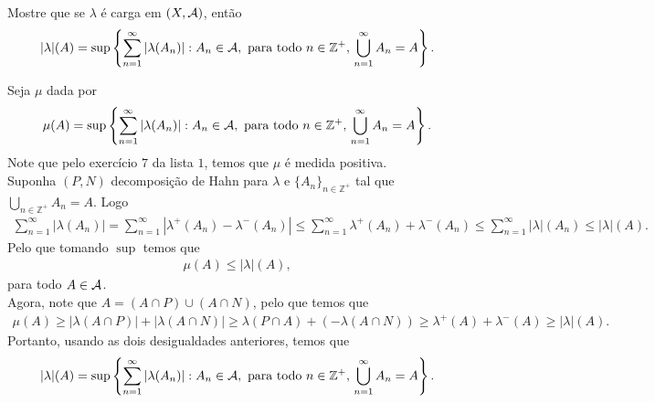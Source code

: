 \begin{homeworkProblem}[1]
  Mostre que se $\lambda$ é carga em $(X,\mathcal{A})$, então
  \begin{align*}
    |\lambda|(A)=\sup\left\{ \sum_{n=1}^{\infty}|\lambda(A_n)|:A_n\in\mathcal{A},\text{ para todo }n\in\mathbb{Z}^{+},\,\bigcup_{n=1}^{\infty}A_n=A \right\}.
  \end{align*}
  \begin{solution}
    Seja $\mu$ dada por
    \begin{align*}
      \mu(A)=\sup\left\{ \sum_{n=1}^{\infty}|\lambda(A_n)|:A_n\in\mathcal{A},\text{ para todo }n\in\mathbb{Z}^{+},\,\bigcup_{n=1}^{\infty}A_n=A \right\}.
    \end{align*}
    Note que pelo exercício $7$ da lista $1$, temos que $\mu$ é medida positiva.\\
    Suponha $(P,N)$ decomposição de Hahn para $\lambda$ e $\{A_n\}_{n\in\mathbb{Z}^{+}}$ tal que $\bigcup_{n\in\mathbb{Z}^{+}}A_n=A$. Logo
    \begin{align*}
      \sum_{n=1}^{\infty}|\lambda(A_n)|=\sum_{n=1}^{\infty}|\lambda^{+}(A_n)-\lambda^{-}(A_n)|\leq \sum_{n=1}^{\infty}\lambda^{+}(A_n)+\lambda^{-}(A_n)\leq \sum_{n=1}^{\infty}|\lambda|(A_n)\leq|\lambda|(A).
    \end{align*}
    Pelo que tomando $\sup$ temos que
    \begin{align*}
      \mu(A)\leq |\lambda|(A),
    \end{align*}
    para todo $A\in\mathcal{A}$.\\
    Agora, note que $A=(A\cap P)\cup(A\cap N)$, pelo que temos que
    \begin{align*}
      \mu(A)\geq |\lambda(A\cap P)|+|\lambda(A\cap N)|\geq \lambda(P\cap A)+\left( -\lambda(A\cap N)\right)\geq \lambda^{+}(A)+\lambda^{-}(A)\geq |\lambda|(A).
    \end{align*}
    Portanto, usando as dois desigualdades anteriores, temos que
    \begin{align*}
      |\lambda|(A)=\sup\left\{ \sum_{n=1}^{\infty}|\lambda(A_n)|:A_n\in\mathcal{A},\text{ para todo }n\in\mathbb{Z}^{+},\,\bigcup_{n=1}^{\infty}A_n=A \right\}.
    \end{align*}
  \end{solution}
\end{homeworkProblem}

